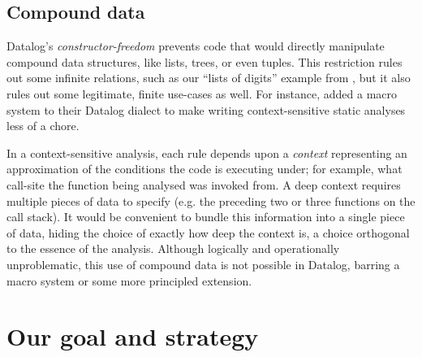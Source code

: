 
\subsection{Compound data}

Datalog's \emph{constructor-freedom} prevents code that would directly
manipulate compound data structures, like lists, trees, or even tuples. This
restriction rules out some infinite relations, such as our ``lists of digits''
example from , but it also rules out some legitimate, finite use-cases as well.
%
For instance, \citet{DBLP:conf/datalog/SmaragdakisB10} added a macro system to
their Datalog dialect to make writing context-sensitive static analyses less of
a chore.

In a context-sensitive analysis, each rule depends upon a \emph{context} representing an approximation of the conditions the code is executing under; for example, what call-site the function being analysed was invoked from.
%
A deep context requires multiple pieces of data to specify (e.g. the preceding
two or three functions on the call stack).
%
It would be convenient to bundle this information into a single piece of data,
hiding the choice of exactly how deep the context is, a choice orthogonal to the
essence of the analysis.
%
Although logically and operationally unproblematic, this use of compound data is
not possible in Datalog, barring a macro system or some more principled
extension.





\section{Our goal and strategy}

